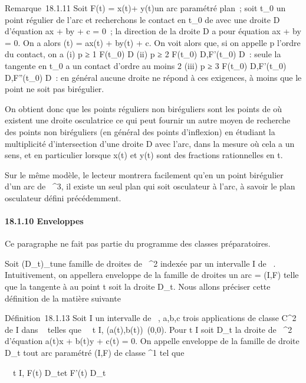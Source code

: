 \documentclass[]{article}
\begin{document}
Remarque~18.1.11 Soit F(t) = x(t)\vec\imath +
y(t) un arc paramétré plan~; soit t\_0
un point régulier de l'arc et recherchons le contact en t\_0 de
\Gamma avec une droite D d'équation ax + by + c = 0~; la direction
\vecD de la droite D a pour équation ax + by = 0. On
a alors \phi(t) = ax(t) + by(t) + c. On voit alors que, si on appelle p
l'ordre du contact, on a (i) p ≥ 1 \Leftrightarrow
F(t\_0) \in D (ii) p ≥ 2 \Leftrightarrow
F(t\_0) \in D,F'(t\_0) \in\vec D~: seule
la tangente en t\_0 a un contact d'ordre au moins 2 (iii) p ≥ 3
\Leftrightarrow F(t\_0) \in D,F'(t\_0)
\in\vec D,F''(t\_0) \in\vec
D~: en général aucune droite ne répond à ces exigences, à moins que le
point ne soit pas birégulier.

On obtient donc que les points réguliers non biréguliers sont les points
de \Gamma où existent une droite osculatrice ce qui peut fournir un autre
moyen de recherche des points non biréguliers (en général des points
d'inflexion) en étudiant la multiplicité d'intersection d'une droite D
avec l'arc, dans la mesure où cela a un sens, et en particulier lorsque
x(t) et y(t) sont des fractions rationnelles en t.

Sur le même modèle, le lecteur montrera facilement qu'en un point
birégulier d'un arc de ~^3, il existe un seul plan qui soit
osculateur à l'arc, à savoir le plan osculateur défini précédemment.

\paragraph{18.1.10 Enveloppes}

Ce paragraphe ne fait pas partie du programme des classes préparatoires.

Soit (D\_t)\_t\inI une famille de droites de
~^2 indexée par un intervalle I de ~. Intuitivement, on
appellera enveloppe de la famille de droites un arc \Gamma = (I,F) telle que
la tangente à \Gamma au point t soit la droite D\_t. Nous allons
préciser cette définition de la matière suivante

Définition~18.1.13 Soit I un intervalle de ~, a,b,c trois applications
de classe C^2 de I dans ~ telles que
\forall~~t \in I,
(a(t),b(t))\neq~(0,0). Pour t \in I soit
D\_t la droite de ~^2 d'équation a(t)x + b(t)y + c(t)
= 0. On appelle enveloppe de la famille de droite D\_t tout arc
paramétré (I,F) de classe ^1 tel que

\forall~~t \in I, F(t) \in
D\_t\text et F'(t)
\in\overrightarrow D\_t
\end{document}
